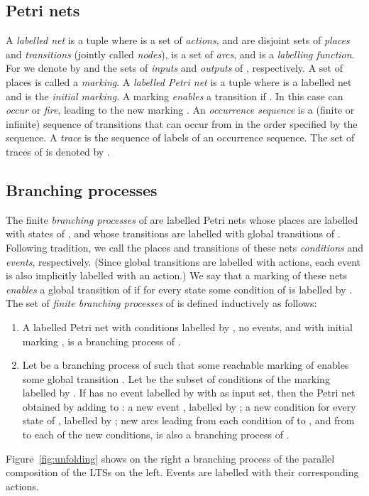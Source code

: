 \documentclass{llncs}
\begin{document}
\subsection{Petri nets}

A \emph{labelled net} is a tuple  where  is a set of {\em actions},  and  are 
disjoint sets of \emph{places} and \emph{transitions} (jointly called \emph{nodes}),  is a set
of {\em arcs}, and  is a {\em labelling
function}. For  we denote by  and  the sets of \emph{inputs} and \emph{outputs} of , respectively. A set  of places is called a \emph{marking}.  
A \emph{labelled Petri net} is a tuple  where  is a labelled net and  is the \emph{initial marking}.
A marking  \emph{enables} a transition  if .
In this case  can \emph{occur} or \emph{fire}, leading to the new marking .
An \emph{occurrence sequence} is a (finite or infinite) sequence of transitions that can occur from  in the 
order specified by the sequence. A \emph{trace} is the sequence of labels of an occurrence 
sequence. The set of traces of  is denoted by .

\subsection{Branching processes}

The finite \emph{branching processes} of 
are labelled Petri nets whose places are labelled with states of , and 
whose transitions are labelled with global transitions of . Following tradition, 
we call the places and transitions of these nets {\em conditions} and {\em events}, respectively.
 (Since global transitions are labelled with 
actions, each event is also implicitly labelled with an action.)
We say that a marking  of these nets {\em enables} a global transition 
 of  if for every state  some condition of  is labelled by . 
The set of {\em finite branching processes} of  is defined inductively as follows:
\begin{enumerate}
\item A labelled Petri net with conditions  labelled by , 
no events, and  
with initial marking ,
is a branching process of .
\item Let  be a branching process of  such that some reachable marking of  enables some  
global transition . Let  be the subset of conditions of the marking labelled by . 
If  has no event labelled by  with  as input set, then the Petri net
obtained by adding to : a new event , labelled by ; a new condition for every state  of 
, labelled by ; new arcs leading from each condition of  to , and from  to each 
of the new conditions, is also a branching process of . 
\end{enumerate}
Figure~\ref{fig:unfolding} shows on the right a branching process 
of the parallel composition of the LTSs on the left. Events are labelled with their corresponding actions.
\end{document}
